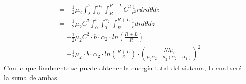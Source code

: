 \documentclass[
  11pt,
  letterpaper,
   addpoints,
   answers
  ]{exam}
\begin{document}
\begin{questions}
\begin{solution}
\begin{enumerate}
{\begin{align}
                  &= -\frac{1}{2}\mu_{2} \int_{0}^{b}\int_{0}^{\alpha_{2}} \int_{R}^{R+L} C^{2} \frac{1}{r^{2}} r dr d\theta dz\\
                  &= -\frac{1}{2}\mu_{2} C^{2} \int_{0}^{b}\int_{0}^{\alpha_{2}} \int_{R}^{R+L} \frac{1}{r} dr d\theta dz\\
                  &=  -\frac{1}{2}\mu_{2}C^{2}  \cdot b \cdot \alpha_{2} \cdot ln\left(\frac{R+L}{R}\right) \\
                  &=  -\frac{1}{2}\mu_{2}  \cdot b \cdot \alpha_{2} \cdot ln\left(\frac{R+L}{R}\right) \cdot \left(\frac{NI \mu_{1}}{\mu_{2}\alpha_{2} - \mu_{2}(\alpha_{2} - \alpha_{1})}\right)^{2}
        \end{align}
        }
        Con lo que finalmente se puede obtener la energía total del sistema, la cual será la suma de ambas.
    \end{enumerate}
\end{solution}
\end{questions}
\newpage
\end{document}
